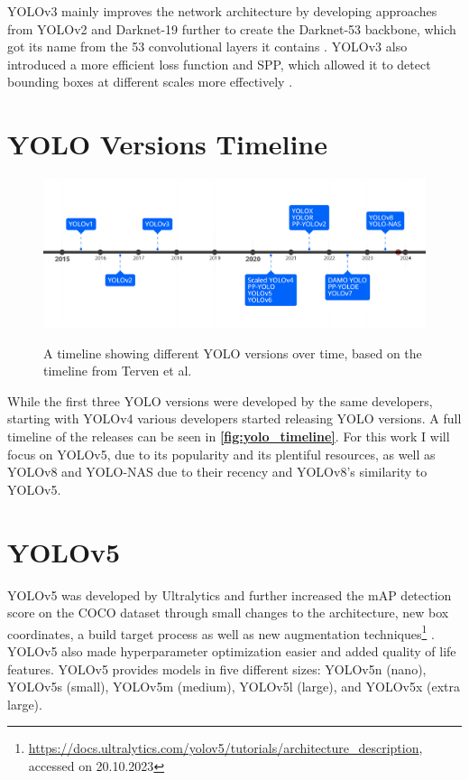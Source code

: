 \documentclass[10pt]{book}
\newcommand{\figureref}[1]{\textbf{\autoref{#1}}}
\begin{document}
\ac{YOLO}v3 mainly improves the network architecture by developing approaches from \ac{YOLO}v2 and Darknet-19 further to create the Darknet-53 backbone, which got its name from the 53 convolutional layers it contains \cite{redmon2018yolov3}. \ac{YOLO}v3 also introduced a more efficient loss function and \ac{SPP}, which allowed it to detect bounding boxes at different scales more effectively \cite{jani2023model}.

\section{YOLO Versions Timeline}

\begin{figure}
  \caption{A timeline showing different \ac{YOLO} versions over time, based on the timeline from Terven et al. \cite{terven2023comprehensive}}
  \includegraphics[width=\textwidth]{image/timeline_fix}
  \label{fig:yolo_timeline}
\end{figure}

While the first three \ac{YOLO} versions were developed by the same developers, starting with \ac{YOLO}v4 various developers started releasing \ac{YOLO} versions. A full timeline of the releases can be seen in \figureref{fig:yolo_timeline}. For this work I will focus on \ac{YOLO}v5, due to its popularity and its plentiful resources, as well as \ac{YOLO}v8 and \ac{YOLO}-NAS due to their recency and \ac{YOLO}v8's similarity to \ac{YOLO}v5.

\section{YOLOv5}

\ac{YOLO}v5 was developed by Ultralytics and further increased the mAP detection score on the COCO dataset through small changes to the architecture, new box coordinates, a build target process as well as new augmentation techniques\footnote{\url{https://docs.ultralytics.com/yolov5/tutorials/architecture_description}, accessed on 20.10.2023} \cite{gjocher2022yolov5,terven2023comprehensive}. \ac{YOLO}v5 also made hyperparameter optimization easier and added quality of life features. \ac{YOLO}v5 provides models in five different sizes: \ac{YOLO}v5n (nano), \ac{YOLO}v5s (small), \ac{YOLO}v5m (medium), \ac{YOLO}v5l (large), and \ac{YOLO}v5x (extra large).
\end{document}
